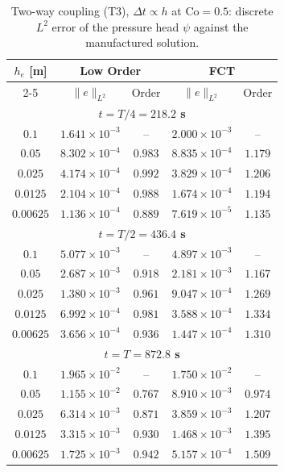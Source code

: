 \begin{table}[h]
\centering
\begin{tabular}{c|cc|cc}
\hline
\multirow{2}{*}{$h_e$ [m]}
& \multicolumn{2}{c|}{\textbf{Low Order}}
& \multicolumn{2}{c}{\textbf{FCT}} \\
\cline{2-5}
& $\|e\|_{L^2}$ & Order
& $\|e\|_{L^2}$ & Order \\
\hline
\hline

\multicolumn{5}{c}{\textbf{$t = T/4 = 218.2$ s}} \\
\hline
$0.1$        & $1.641\times10^{-3}$ & --
           & $2.000\times10^{-3}$ & -- \\
$0.05$       & $8.302\times10^{-4}$ & $0.983$
           & $8.835\times10^{-4}$ & $1.179$ \\
$0.025$      & $4.174\times10^{-4}$ & $0.992$
           & $3.829\times10^{-4}$ & $1.206$ \\
$0.0125$     & $2.104\times10^{-4}$ & $0.988$
           & $1.674\times10^{-4}$ & $1.194$ \\
$0.00625$    & $1.136\times10^{-4}$ & $0.889$
           & $7.619\times10^{-5}$ & $1.135$ \\
\hline\hline

\multicolumn{5}{c}{\textbf{$t = T/2 = 436.4$ s}} \\
\hline
$0.1$        & $5.077\times10^{-3}$ & --
           & $4.897\times10^{-3}$ & -- \\
$0.05$       & $2.687\times10^{-3}$ & $0.918$
           & $2.181\times10^{-3}$ & $1.167$ \\
$0.025$      & $1.380\times10^{-3}$ & $0.961$
           & $9.047\times10^{-4}$ & $1.269$ \\
$0.0125$     & $6.992\times10^{-4}$ & $0.981$
           & $3.588\times10^{-4}$ & $1.334$ \\
$0.00625$    & $3.656\times10^{-4}$ & $0.936$
           & $1.447\times10^{-4}$ & $1.310$ \\
\hline\hline

\multicolumn{5}{c}{\textbf{$t = T = 872.8$ s}} \\
\hline
$0.1$        & $1.965\times10^{-2}$ & --
           & $1.750\times10^{-2}$ & -- \\
$0.05$       & $1.155\times10^{-2}$ & $0.767$
           & $8.910\times10^{-3}$ & $0.974$ \\
$0.025$      & $6.314\times10^{-3}$ & $0.871$
           & $3.859\times10^{-3}$ & $1.207$ \\
$0.0125$     & $3.315\times10^{-3}$ & $0.930$
           & $1.468\times10^{-3}$ & $1.395$ \\
$0.00625$    & $1.725\times10^{-3}$ & $0.942$
           & $5.157\times10^{-4}$ & $1.509$ \\
\hline
\end{tabular}
\caption{Two-way coupling (T3), $\Delta t\propto h$ at $\mathrm{Co}=0.5$: discrete $L^2$ error of the pressure head $\psi$ against the manufactured solution.}
\label{tab:mms_t3_psi}
\end{table}
